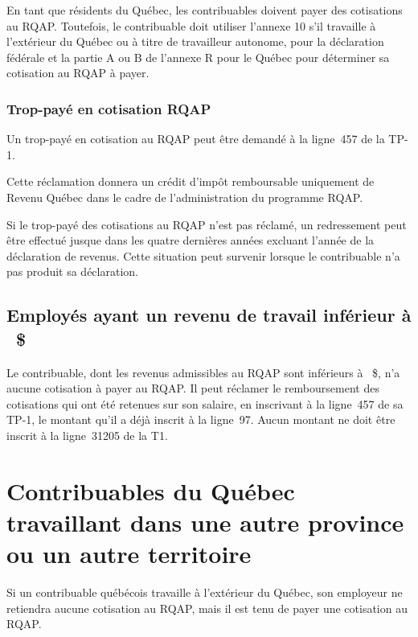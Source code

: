 En tant que résidents du Québec, les contribuables doivent payer des cotisations au RQAP. Toutefois, le contribuable doit utiliser l'annexe 10 s'il travaille à l'extérieur du Québec ou à titre de travailleur autonome, pour la déclaration fédérale et la partie A ou B de l'annexe R pour le Québec pour déterminer sa cotisation au RQAP à payer.

\subsubsection{Trop-payé en cotisation RQAP}
Un trop-payé en cotisation au RQAP peut être demandé à la ligne~457 de la TP-1. 

Cette réclamation donnera un crédit d'impôt remboursable uniquement de Revenu Québec dans le cadre de l'administration du programme RQAP.

\begin{note}
	Si le trop-payé des cotisations au RQAP n'est pas réclamé, un redressement peut être effectué jusque dans les quatre dernières années excluant l'année de la déclaration de revenus. Cette situation peut survenir lorsque le contribuable n'a pas produit sa déclaration.
\end{note}


\subsection{Employés ayant un revenu de travail inférieur à ~\$}

Le contribuable, dont les revenus admissibles au RQAP sont inférieurs à ~\$, n'a aucune cotisation à payer au RQAP. Il peut réclamer le remboursement des cotisations qui ont été retenues sur son salaire, en inscrivant à la ligne~457 de sa TP-1, le montant qu'il a déjà inscrit à la ligne~97. Aucun montant ne doit être inscrit à la ligne~31205 de la T1.



\section{Contribuables du Québec travaillant dans une autre province ou un autre territoire}
\begin{note}
	Si un contribuable québécois travaille à l'extérieur du Québec, son employeur ne retiendra aucune cotisation au RQAP, mais il est tenu de payer une cotisation au RQAP.
\end{note}

